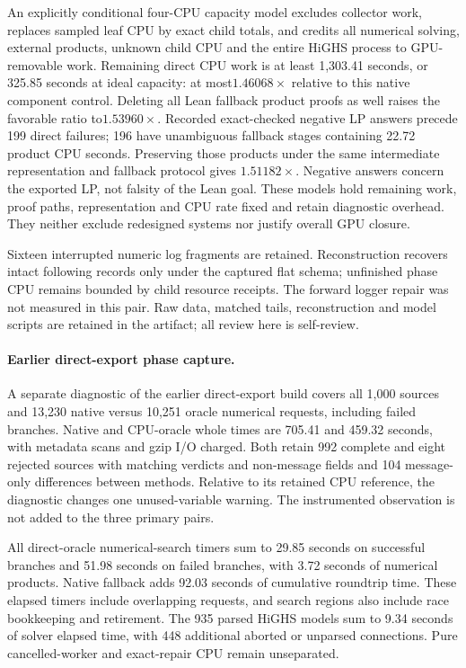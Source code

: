 \documentclass[10pt,twocolumn]{article}
\begin{document}
An explicitly conditional four-CPU capacity model excludes collector work,
replaces sampled leaf CPU by exact child totals, and credits all numerical
solving, external products, unknown child CPU and the entire HiGHS process to
GPU-removable work. Remaining direct CPU work is at least 1,303.41 seconds,
or 325.85 seconds at ideal capacity: at most$1.46068\times$ relative to this
native component control. Deleting all Lean fallback product proofs as well
raises the favorable ratio to$1.53960\times$.
Recorded exact-checked negative LP answers precede 199 direct failures;
196 have unambiguous fallback stages containing 22.72 product CPU seconds.
Preserving those products under the same intermediate representation and fallback protocol gives
$1.51182\times$. Negative answers concern the exported LP, not falsity of
the Lean goal. These models hold remaining work, proof paths, representation
and CPU rate fixed and retain diagnostic overhead. They neither exclude
redesigned systems nor justify overall GPU closure.

Sixteen interrupted numeric log fragments are retained. Reconstruction recovers
intact following records only under the captured flat schema; unfinished
phase CPU remains bounded by child resource receipts. The forward logger
repair was not measured in this pair. Raw data, matched tails, reconstruction
and model scripts are retained in the artifact; all review here is self-review.

\paragraph{Earlier direct-export phase capture.}
A separate diagnostic of the earlier direct-export build covers all 1,000 sources and
13,230 native versus 10,251 oracle numerical requests, including failed
branches. Native and CPU-oracle whole times are 705.41 and 459.32 seconds,
with metadata scans and gzip I/O charged. Both retain 992 complete and eight
rejected sources with matching verdicts and non-message fields and
104 message-only differences between methods. Relative to its retained
CPU reference, the diagnostic changes one unused-variable warning.
The instrumented observation is not added to the three primary pairs.

All direct-oracle numerical-search timers sum to 29.85 seconds on successful
branches and 51.98 seconds on failed branches, with 3.72 seconds of numerical
products. Native fallback adds 92.03 seconds of cumulative roundtrip time.
These elapsed timers include overlapping requests, and search regions also
include race bookkeeping and retirement. The 935 parsed HiGHS models sum to
9.34 seconds of solver elapsed time, with 448 additional aborted or unparsed
connections. Pure cancelled-worker and exact-repair CPU remain unseparated.
\end{document}
